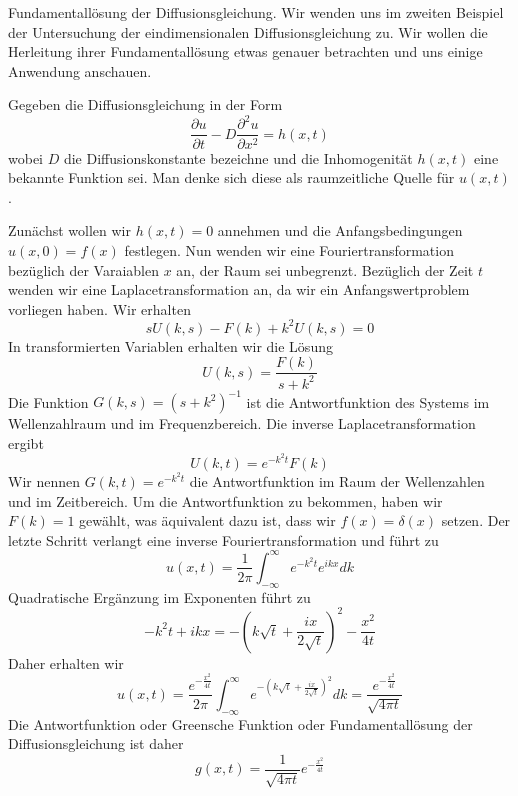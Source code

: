 \begin{example}{Fundamentallösung der Diffusionsgleichung.}
Wir wenden uns im zweiten Beispiel der Untersuchung der eindimensionalen
Diffusionsgleichung zu. Wir wollen die Herleitung ihrer Fundamentallösung
etwas genauer betrachten und uns einige Anwendung anschauen.

Gegeben die Diffusionsgleichung in der Form
\begin{equation} 
	\frac{\partial u}{\partial t}-D\frac{\partial^2 u}{\partial x^2}=h(x,t)
	\label{eqndiffusion}
\end{equation}
wobei $D$ die Diffusionskonstante bezeichne und die Inhomogenität $h(x,t)$ eine bekannte Funktion sei. Man denke sich diese als raumzeitliche Quelle für $u(x,t)$.

Zunächst wollen wir $h(x,t)=0$ annehmen und die Anfangsbedingungen
$u(x,0)=f(x)$ festlegen. Nun wenden wir eine Fouriertransformation bezüglich
der Varaiablen $x$ an, der Raum sei unbegrenzt.  Bezüglich der Zeit $t$
wenden wir eine Laplacetransformation an, da wir ein Anfangswertproblem
vorliegen haben. Wir erhalten
\begin{equation}
	sU(k,s)-F(k)+k^2U(k,s)=0
	\label{eqntransfdiff}
\end{equation}
In transformierten Variablen erhalten wir die Lösung 
\[U(k,s)=\frac{F(k)}{s+k^2}\]
Die Funktion $G(k,s)=(s+k^2)^{-1}$ ist die Antwortfunktion des Systems im
Wellenzahlraum und im Frequenzbereich.
Die inverse Laplacetransformation ergibt
\[U(k,t)=e^{-k^2t}F(k)\]
Wir nennen $G(k,t)=e^{-k^2t}$ die Antwortfunktion im Raum der Wellenzahlen und
im Zeitbereich.  Um die Antwortfunktion zu bekommen, haben wir $F(k)=1$
gewählt, was äquivalent dazu ist, dass wir $f(x)=\delta(x)$ setzen. Der
letzte Schritt verlangt eine inverse Fouriertransformation und führt zu
\begin{equation}
	u(x,t)=\frac{1}{2\pi}\int_{-\infty}^\infty e^{-k^2t}e^{ikx}dk
	\label{eqninvfourierdiff}
\end{equation}
Quadratische Ergänzung im Exponenten führt zu
\begin{equation}
	-k^2t+ikx=-\left(k\sqrt{t}+\frac{ix}{2\sqrt{t}}\right)^2-\frac{x^2}{4t}
	\label{eqncomplsquare}
\end{equation}
Daher erhalten wir
\[
u(x,t)=\frac{e^{-\frac{x^2}{4t}}}{2\pi}\int_{-\infty}^\infty e^{-\left(k\sqrt{t}+\frac{ix}{2\sqrt{t}}\right)^2}dk=\frac{e^{-\frac{x^2}{4t}}}{\sqrt{4\pi t}}
\]
Die Antwortfunktion oder Greensche Funktion oder Fundamentallösung der Diffusionsgleichung ist daher
\begin{equation}
	g(x,t)=\frac{1}{\sqrt{4\pi t}}e^{-\frac{x^2}{4t}}
	\label{eqngreendiff}
\end{equation}
\end{example}

